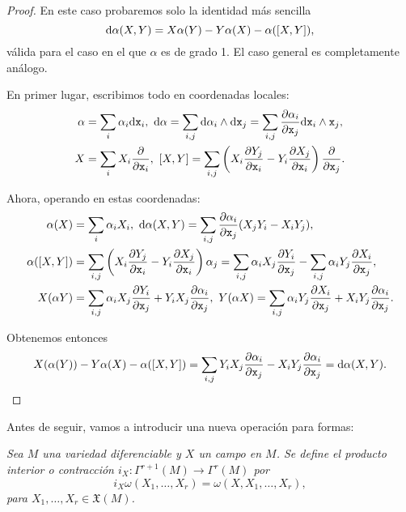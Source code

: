 \begin{proof}
En este caso probaremos solo la identidad más sencilla 
\begin{equation*}
  \mathrm{d} \alpha (X,Y) = X\alpha(Y) - Y \alpha(X) - \alpha(\left[X,Y\right]),
\end{equation*}
válida para el caso en el que $\alpha$ es de grado 1. El caso general es completamente análogo.

En primer lugar, escribimos todo en coordenadas locales:
\begin{align*}
  \alpha &= \sum_i \alpha_i \dd \xx _i, \ \dd \alpha = \sum_{i,j} \dd \alpha_i \wedge \dd \xx _j = \sum_{i,j}\parcial{\alpha_i}{\xx_j} \dd \xx_i \wedge \xx_j, \\
  X &= \sum_i X_i \deriv{\xx_i}, \ 
  \lie{X}{Y} = \sum_{i,j} \left( X_i \parcial{Y_j}{\xx_i} - Y_i \parcial{X_j}{\xx_i} \right) \deriv{\xx_j}.
\end{align*}

Ahora, operando en estas coordenadas:
\begin{align*}
  \alpha(X) &= \sum_i \alpha_i X_i, \ 
  \dd \alpha (X,Y) = \sum_{i,j} \parcial{\alpha_i}{\xx_j} (X_jY_i-X_iY_j), \\
  \alpha(\lie{X}{Y}) &= \sum_{i,j} \left( X_i \parcial{Y_j}{\xx_i} - Y_i \parcial{X_j}{\xx_i} \right) \alpha_j = \sum_{i,j} \alpha_i X_j \parcial{Y_i}{\xx_j} - \sum_{i,j}\alpha_i Y_j \parcial{X_i}{\xx_j}, \\
  X(\alpha Y) &= \sum_{i,j}\alpha_i X_j \parcial{Y_i}{\xx_j} + Y_i X_j \parcial{\alpha_i}{\xx_j}, \ 
Y(\alpha X) = \sum_{i,j}\alpha_i Y_j \parcial{X_i}{\xx_j} + X_i Y_j \parcial{\alpha_i}{\xx_j}.
\end{align*}

Obtenemos entonces
\begin{equation*}
  X(\alpha(Y))-Y\alpha(X)-\alpha(\left[X,Y\right]) = \sum_{i,j} Y_iX_j \frac{\partial \alpha_i}{\partial \mathtt{x}_j} - X_iY_j \frac{\partial \alpha_i}{\partial \mathtt{x}_j} = \mathrm{d} \alpha (X,Y).
\end{equation*}
\end{proof}

Antes de seguir, vamos a introducir una nueva operación para formas:
\begin{defn}
  \em
  Sea $M$ una variedad diferenciable y $X$ un campo en $M$. Se define el \emph{producto interior} o \emph{contracción} $i_X:\Gamma^{r+1}(M)\rightarrow \Gamma^r(M)$ por 
  \begin{equation*}
    i_X \omega(X_1,\dots,X_r)=\omega(X,X_1,\dots,X_r),
  \end{equation*}
  para $X_1,\dots,X_r \in \mathfrak{X}(M)$.
\end{defn}

